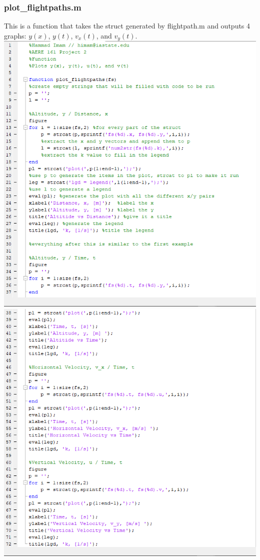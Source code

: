 \documentclass[oneside]{article}
\begin{document}
\subsubsection{plot\_flightpaths.m}
This is a function that takes the struct generated by flightpath.m and outputs 4 graphs: $y(x)$, $y(t)$, $v_x(t)$, and $v_y(t)$.\\
\includegraphics [width=\linewidth]{code_plot_flightpaths1.png}
\includegraphics [width=\linewidth]{code_plot_flightpaths2.png}
\end{document}
